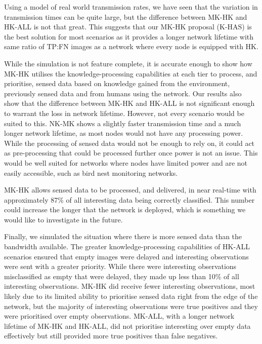Using a model of real world transmission rates, we have seen that the variation in transmission times can be quite large, but the difference between MK-HK and HK-ALL is not that great. This suggests that our MK-HK proposal (K-HAS) is the best solution for most scenarios as it provides a longer network lifetime with same ratio of TP:FN images as a network where every node is equipped with HK.

While the simulation is not feature complete, it is accurate enough to show how MK-HK utilises the knowledge-processing capabilities at each tier to process, and prioritise, sensed data based on knowledge gained from the environment, previously sensed data and from humans using the network. Our results also show that the difference between MK-HK and HK-ALL is  not significant enough to warrant the loss in network lifetime. However, not every scenario would be suited to this. NK-MK shows a slightly faster transmission time and a much longer network lifetime, as most nodes would not have any processing power. While the processing of sensed data would not be enough to rely on, it could act as pre-processing that could be processed further once power is not an issue. This would be well suited for networks where nodes have limited power and are not easily accessible, such as bird nest monitoring networks. 

MK-HK allows sensed data to be processed, and delivered, in near real-time with approximately 87\% of all interesting data being correctly classified. This number could increase the longer that the network is deployed, which is something we would like to investigate in the future.

Finally, we simulated the situation where there is more sensed data than the bandwidth available. The greater knowledge-processing capabilities of HK-ALL scenarios ensured that empty images were delayed and interesting observations were sent with a greater priority. While there were interesting observations misclassified as empty that were delayed, they made up less than 10\% of all interesting observations. MK-HK did receive fewer interesting observations, most likely due to its limited ability to prioritise sensed data right from the edge of the network, but the majority of interesting observations were true positives and they were prioritised over empty observations. MK-ALL, with a longer network lifetime of MK-HK and HK-ALL, did not prioritise interesting over empty data effectively but still provided more true positives than false negatives.

